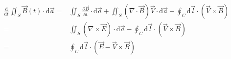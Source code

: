 \documentclass[10pt,fleqn]{article}
\newcommand{\ud}{\mathrm{d}}
\newcommand{\eqar}[1]
{
  \begin{align*}
    #1
  \end{align*}
}
\newcommand{\paren}[1]{{\left({#1}\right)}}
\newcommand{\pdiff}[3][{}]{{\frac{\partial^{#1} {#2}}{\partial {#3}{}^{#1}}}}
\newcommand{\diff}[3][{}]{{\frac{\ud^{#1} {#2}}{\ud {#3}{}^{#1}}}}
\begin{document}
\subsection{}
\eqar{
  \diff{}{t}\iint_{S}\vec B\paren{t}\cdot\ud\vec a=&\iint_{S}\pdiff{\vec B}t\cdot\ud\vec a+\iint_{S}\paren{\nabla\cdot\vec B}\vec V\cdot\ud\vec a-\oint_{C}\ud\vec l\cdot\paren{\vec V\times\vec B}\\
  =&\iint_{S}\paren{\nabla\times\vec E}\cdot\ud\vec a-\oint_{C}\ud\vec l\cdot\paren{\vec V\times\vec B}\\
  =&\oint_{C}\ud\vec l\cdot\paren{\vec E-\vec V\times\vec B}
}
\end{document}
